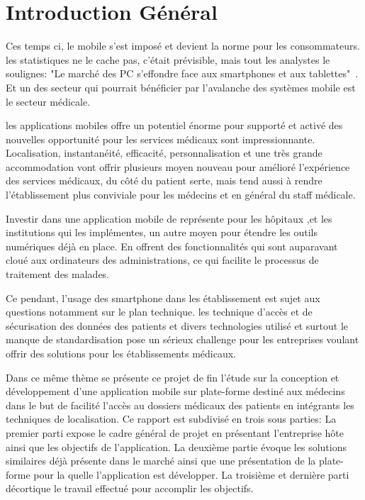 
\chapter{Introduction Général}

Ces temps ci, le mobile s'est imposé et devient la norme pour les
consommateurs. les statistiques ne le cache pas, c'était prévisible, mais tout
les analystes le soulignes: "Le marché des PC s'effondre face aux smartphones
et aux tablettes"~\cite{lefigaro}. Et un des secteur qui pourrait bénéficier
par l'avalanche des systèmes mobile est le secteur médicale.

les applications mobiles offre un potentiel énorme pour supporté et activé des
nouvelles opportunité pour les services médicaux sont impressionnante.
Localisation, instantanéité, efficacité, personnalisation et une très grande
accommodation vont offrir plusieurs moyen nouveau pour amélioré l'expérience des
services médicaux, du côté du patient serte, mais tend aussi à rendre
l'établissement plus conviviale pour les médecins et en général du staff
médicale.

Investir dans une application mobile de représente pour les hôpitaux ,et les
institutions qui les implémentes, un autre moyen pour étendre les outils
numériques déjà en place. En offrent des fonctionnalités qui sont auparavant
cloué aux ordinateurs des administrations, ce qui facilite le processus de
traitement des malades.

Ce pendant, l'usage des smartphone dans les établissement est sujet aux
questions notamment sur le plan technique. les technique d'accès et de
sécurisation des données des patients et divers technologies utilisé et surtout
le manque de standardisation pose un sérieux challenge pour les entreprises
voulant offrir des solutions pour les établissements médicaux.

Dans ce même thème se présente ce projet de fin l'étude sur la conception et
développement d'une application mobile sur plate-forme \android destiné aux
médecins dans le but de facilité l'accès au dossiers médicaux des patients en
intégrants les techniques de localisation. Ce rapport est subdivisé en trois
sous parties: La premier parti expose le cadre général de projet en présentant
l'entreprise hôte ainsi que les objectifs de l'application. La deuxième partie
évoque les solutions similaires déjà présente dans le marché ainsi que une
présentation de la plate-forme pour la quelle l'application est développer. La
troisième et dernière parti décortique le travail effectué pour accomplir les
objectifs.
